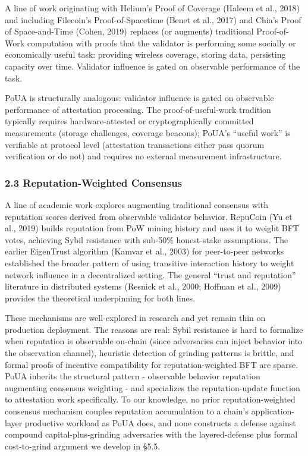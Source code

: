 \documentclass[
  11pt,
]{article}
\newcounter{none} %
\begin{document}
A line of work originating with Helium's Proof of Coverage (Haleem et
al., 2018) and including Filecoin's Proof-of-Spacetime (Benet et al.,
2017) and Chia's Proof of Space-and-Time (Cohen, 2019) replaces (or
augments) traditional Proof-of-Work computation with proofs that the
validator is performing some socially or economically useful task:
providing wireless coverage, storing data, persisting capacity over
time. Validator influence is gated on observable performance of the
task.

PoUA is structurally analogous: validator influence is gated on
observable performance of attestation processing. The
proof-of-useful-work tradition typically requires hardware-attested or
cryptographically committed measurements (storage challenges, coverage
beacons); PoUA's ``useful work'' is verifiable at protocol level
(attestation transactions either pass quorum verification or do not) and
requires no external measurement infrastructure.

\subsubsection{2.3 Reputation-Weighted
Consensus}\label{reputation-weighted-consensus}

A line of academic work explores augmenting traditional consensus with
reputation scores derived from observable validator behavior. RepuCoin
(Yu et al., 2019) builds reputation from PoW mining history and uses it
to weight BFT votes, achieving Sybil resistance with sub-50\%
honest-stake assumptions. The earlier EigenTrust algorithm (Kamvar et
al., 2003) for peer-to-peer networks established the broader pattern of
using transitive interaction history to weight network influence in a
decentralized setting. The general ``trust and reputation'' literature
in distributed systems (Resnick et al., 2000; Hoffman et al., 2009)
provides the theoretical underpinning for both lines.

These mechanisms are well-explored in research and yet remain thin on
production deployment. The reasons are real: Sybil resistance is hard to
formalize when reputation is observable on-chain (since adversaries can
inject behavior into the observation channel), heuristic detection of
grinding patterns is brittle, and formal proofs of incentive
compatibility for reputation-weighted BFT are sparse. PoUA inherits the
structural pattern - observable behavior reputation augmenting consensus
weighting - and specializes the reputation-update function to
attestation work specifically. To our knowledge, no prior
reputation-weighted consensus mechanism couples reputation accumulation
to a chain's application-layer productive workload as PoUA does, and
none constructs a defense against compound capital-plus-grinding
adversaries with the layered-defense plus formal cost-to-grind argument
we develop in §5.5.
\end{document}
